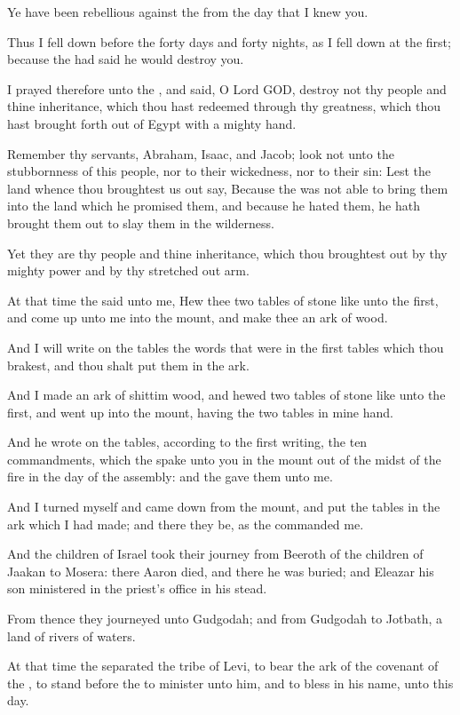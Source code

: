 \Verse Ye have been rebellious against the \LORD from the day that I knew you.

\Verse Thus I fell down before the \LORD forty days and forty nights, as I fell down at the first; because the \LORD had said he would destroy you.

\Verse I prayed therefore unto the \LORD, and said, O Lord GOD, destroy not thy people and thine inheritance, which thou hast redeemed through thy greatness, which thou hast brought forth out of Egypt with a mighty hand.

\Verse Remember thy servants, Abraham, Isaac, and Jacob; look not unto the stubbornness of this people, nor to their wickedness, nor to their sin: \Verse Lest the land whence thou broughtest us out say, Because the \LORD was not able to bring them into the land which he promised them, and because he hated them, he hath brought them out to slay them in the wilderness.

\Verse Yet they are thy people and thine inheritance, which thou broughtest out by thy mighty power and by thy stretched out arm.


\Chapter
\Verse At that time the \LORD said unto me, Hew thee two tables of stone like unto the first, and come up unto me into the mount, and make thee an ark of wood.

\Verse And I will write on the tables the words that were in the first tables which thou brakest, and thou shalt put them in the ark.

\Verse And I made an ark of shittim wood, and hewed two tables of stone like unto the first, and went up into the mount, having the two tables in mine hand.

\Verse And he wrote on the tables, according to the first writing, the ten commandments, which the \LORD spake unto you in the mount out of the midst of the fire in the day of the assembly: and the \LORD gave them unto me.

\Verse And I turned myself and came down from the mount, and put the tables in the ark which I had made; and there they be, as the \LORD commanded me.

\Verse And the children of Israel took their journey from Beeroth of the children of Jaakan to Mosera: there Aaron died, and there he was buried; and Eleazar his son ministered in the priest's office in his stead.

\Verse From thence they journeyed unto Gudgodah; and from Gudgodah to Jotbath, a land of rivers of waters.

\Verse At that time the \LORD separated the tribe of Levi, to bear the ark of the covenant of the \LORD, to stand before the \LORD to minister unto him, and to bless in his name, unto this day.

